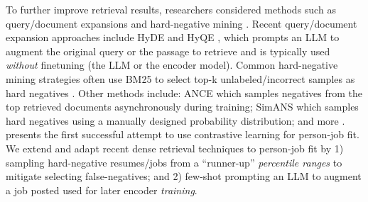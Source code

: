 To further improve retrieval results, researchers considered methods such as query/document expansions \cite{query-expansion-survey} and hard-negative mining \cite{robinson2021contrastive}.
Recent query/document expansion approaches include HyDE \cite{hyde} and HyQE \cite{hyqe}, which prompts an LLM to augment the original query or the passage to retrieve and is typically used \emph{without} finetuning (the LLM or the encoder model). Common hard-negative mining strategies often use BM25 to select top-k unlabeled/incorrect samples as hard negatives \cite{DPR,Zhao2024,nguyen-etal-2023-passage}. Other methods include: ANCE \cite{xiong2021approximate} which samples negatives from the top retrieved documents asynchronously during training; SimANS \cite{zhou-etal-2022-simans} which samples hard negatives using a manually designed probability distribution; and more \cite{zhan2021,syneg}. \confitold{} \cite{confit_v1} presents the first successful attempt to use contrastive learning for person-job fit.
We extend \confitold{} and adapt recent dense retrieval techniques to person-job fit by 1) sampling hard-negative resumes/jobs from a ``runner-up'' \emph{percentile ranges} to mitigate selecting false-negatives; and 2) few-shot prompting an LLM to augment a job posted used for later encoder \emph{training}.


